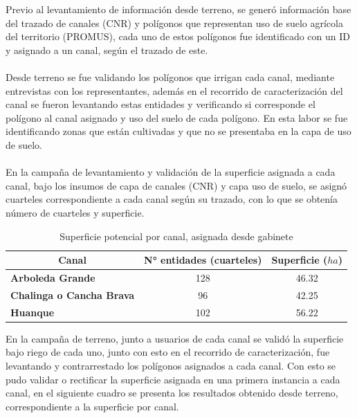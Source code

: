 \documentclass[]{article}
\begin{document}
Previo al levantamiento de información desde terreno, se generó información base del trazado de canales (CNR) y polígonos que representan uso de suelo agrícola del territorio (PROMUS), cada uno de estos polígonos fue identificado  con un ID y asignado a un canal, según el trazado de este.\\
\\
Desde terreno se fue validando los polígonos que irrigan cada canal, mediante entrevistas con los representantes, además en el recorrido de caracterización del canal se fueron levantando estas entidades y verificando si corresponde el polígono al canal asignado y uso del suelo de cada polígono. En esta labor se fue identificando zonas que están cultivadas y que no se presentaba en la capa de uso de suelo.\\
\\
En la campaña de levantamiento y validación de la superficie asignada a cada canal, bajo los insumos de capa de canales (CNR) y capa uso de suelo, se asignó cuarteles correspondiente a cada canal según su trazado, con lo que se obtenía número de cuarteles y superficie.

\begin{table}[H]
\centering
\caption{Superficie potencial por canal, asignada desde gabinete}
\label{my-label}
\begin{tabular}{|l|c|c|}
\hline
\multicolumn{1}{|c|}{\textbf{Canal}} & \textbf{N° entidades (cuarteles)} & \textbf{Superficie ($ha$)} \\ \hline
\textbf{Arboleda Grande}             & 128                               & 46.32                    \\ \hline
\textbf{Chalinga o Cancha Brava}     & 96                                & 42.25                    \\ \hline
\textbf{Huanque}                     & 102                               & 56.22                    \\ \hline
\end{tabular}
\end{table}

En la campaña de terreno, junto a usuarios de cada canal se validó la superficie bajo riego de cada uno, junto con esto en el recorrido de caracterización, fue levantando y contrarrestado los polígonos asignados a cada canal. Con esto se pudo validar o rectificar la superficie asignada en una primera instancia a cada canal, en el siguiente cuadro se presenta los resultados obtenido desde terreno, correspondiente a la superficie por canal.
\end{document}
